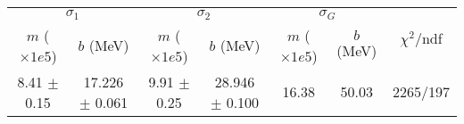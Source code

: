 \begin{tabular}{cc|cc|cc||c}
\multicolumn{2}{c|}{$\sigma_1$} & \multicolumn{2}{|c}{$\sigma_2$} & \multicolumn{2}{|c}{$\sigma_G$}  & \multirow{2}{*}{$\chi^2/$ndf}\\
$m$ ($\times1e5$) & $b$ (MeV) & $m$ ($\times1e5$) & $b$ (MeV) & $m$ ($\times1e5$) & $b$ (MeV) & \\
\hline
8.41 $\pm$ 0.15 & 17.226 $\pm$ 0.061 & 9.91 $\pm$ 0.25 & 28.946 $\pm$ 0.100 & 16.38 & 50.03 & 2265/197\\
\end{tabular}

